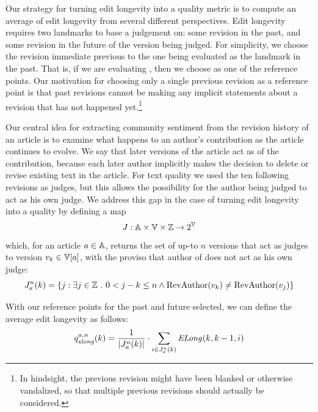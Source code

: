 Our strategy for turning edit longevity into a quality metric
is to compute an average of edit longevity from several different
perspectives.
Edit longevity requires two landmarks to base a judgement on:
some revision in the past, and some revision in the future of
the version being judged.
For simplicity, we choose the revision immediate previous to
the one being evaluated as the landmark in the past.
That is, if we are evaluating , then we choose
 as one of the reference points.
Our motivation for choosing only a single previous revision
as a reference point is that past revisions cannot be making
any implicit statements about a revision that has not happened
yet.\footnote{In hindsight, the previous revision might have been
blanked or otherwise vandalized, so that multiple previous revisions
should actually be considered.}

Our central idea for extracting community sentiment from the
revision history of an article is to examine what happens to an
author's contribution as the article continues to evolve.
We say that later versions of the article act as 
of the contribution, because each later author implicitly makes
the decision to delete or revise existing text in the article.
For text quality we used the ten following revisions as judges,
but this allows the possibility for the author being judged
to act as his own judge.
We address this gap in the case of turning edit longevity into
a quality by defining a map
\begin{equation*}
J : \articles \times \versions{} \times \mathbb{Z} \to 2^\versions{}
\end{equation*}
which, for an article $a \in \mathbb{A}$,
returns the set of up-to $n$ versions that act as judges
to version $\version{k} \in \versions{a}$, with the proviso
that author of  does not act as his own judge:
\begin{equation}
\judges{a}{n}{k} = \{ j : \exists j \in \mathbb{Z}\ .\ 0 < j - k \le n
    \wedge \revauthor{\version{k}} \ne \revauthor{\version{j}} \}
\label{def:judges}
\end{equation}

With our reference points for the past and future selected, we
can define the average edit longevity as follows:
\begin{equation*}
\quality{elong}{a,n}{k} = \frac{1}{|\judges{a}{n}{k}|} \cdot
      \sum_{i \in \judges{a}{n}{k}} \esurv{}{k,k-1,i}
\end{equation*}

